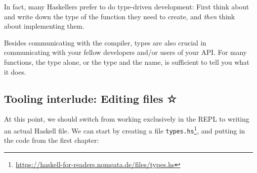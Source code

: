 \documentclass[11pt,
  american,
  DIV13]{article}
\DeclareRobustCommand{\href}[2]{#2\footnote{\url{#1}}}
\begin{document}
In fact, many Haskellers prefer to do type-driven development: First
think about and write down the type of the function they need to create,
and \emph{then} think about implementing them.

Besides communicating with the compiler, types are also crucial in
communicating with your fellow developers and/or users of your API. For
many functions, the type alone, or the type and the name, is sufficient
to tell you what it does.

\hypertarget{tooling-interlude-editing-files}{%
\subsection{Tooling interlude: Editing files
☆}\label{tooling-interlude-editing-files}}

At this point, we should switch from working exclusively in the REPL to
writing an actual Haskell file. We can start by creating a file
\href{https://haskell-for-readers.nomeata.de/files/types.hs}{\texttt{types.hs}},
and putting in the code from the first chapter:
\end{document}
